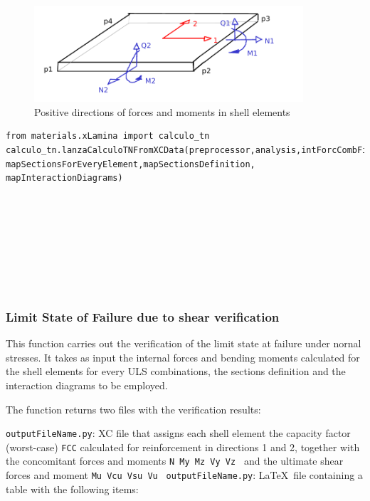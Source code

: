 \begin{figure}[h]
\centering
\includegraphics[width=100mm]{materials/figures/signosEsfuerzos}
\caption{Positive directions of forces and moments in shell elements}\label{shell_forces_moments}
\end{figure}

 
\begin{verbatim}
from materials.xLamina import calculo_tn
calculo_tn.lanzaCalculoTNFromXCData(preprocessor,analysis,intForcCombFileName,outputFileName, 
mapSectionsForEveryElement,mapSectionsDefinition, mapInteractionDiagrams)
\end{verbatim}
\begin{paramFuncTable}
\preprocessor{} \\
\analysis{} \\
\\
\outputFileName{}\\
\mapSectionsForEveryElement{} \\
\mapSectionsDefinition{} \\
\mapInteractionDiagrams{} \\
\end{paramFuncTable}


\subsubsection{Limit State of Failure due to shear verification}
This function carries out the verification of the limit state at failure under nornal stresses. It takes as input the internal forces and bending moments calculated for the shell elements for every ULS combinations, the sections definition and the interaction diagrams to be employed.

The function returns two files with the verification results:

{\tt outputFileName.py}: XC file that assigns each shell element the capacity factor (worst-case) {\tt FCC} calculated for reinforcement in directions 1 and 2, together with the concomitant forces and moments {\tt N My Mz  Vy Vz } and the ultimate shear forces and moment {\tt Mu Vcu Vsu Vu }
{\tt outputFileName.py}: \LaTeX\  file containing a table with the following items:

